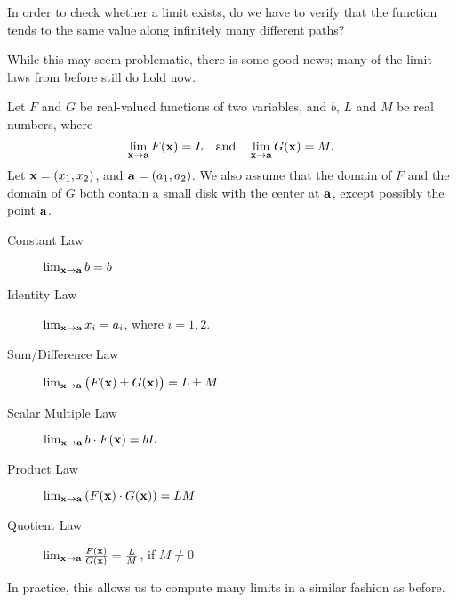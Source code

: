 \documentclass{ximera}
\begin{document}


In order to check whether a limit exists, do we have to verify that the function tends to the same value along infinitely many different paths?

  While this may seem problematic, there is some good news; many of the limit laws from before still do hold now.

\begin{theorem}
  Let $F$ and $G$ be real-valued functions of two
  variables, and $b$, $L$ and $M$ be real numbers, where
  \[
  \lim_{\mathbf{x}\to\mathbf{a}}F(\mathbf{x}) = L \quad \text{and}\quad \lim_{\mathbf{x}\to\mathbf{a}} G(\mathbf{x}) = M.
  \]
Let $\mathbf{x} = \left(x_{1},x_{2}\right)$, and $\mathbf{a} = \left(a_{1},a_{2}\right)$. We  also assume that  the domain of $F$ and the domain of $G$
 both  contain a small disk with the center at $\mathbf{a}$, except possibly the point $\mathbf{a}$.
\begin{description}
\item[Constant Law] $\lim_{\mathbf{x}\to \mathbf{a}} b = b$
\item[Identity Law] $\lim_{\mathbf{x}\to \mathbf{a}} x_i = a_i$, where $i=1,2.$
\item[Sum/Difference Law] $\lim_{\mathbf{x}\to \mathbf{a}}\big(F(\mathbf{x})\pm G(\mathbf{x})\big) = L\pm M$
\item[Scalar Multiple Law] $\lim_{\mathbf{x}\to \mathbf{a}} b\cdot F(\mathbf{x}) = bL$
\item[Product Law] $\lim_{\mathbf{x}\to \mathbf{a}} \left(F(\mathbf{x})\cdot G(\mathbf{x})\right) = LM$
\item[Quotient Law] $\lim_{\mathbf{x}\to \mathbf{a}} \frac{F(\mathbf{x})}{G(\mathbf{x})} = \frac{L}{M}$, if $M\neq 0$
\end{description}
\end{theorem}

In practice, this allows us to compute many limits in a similar fashion as before.
\end{document}
